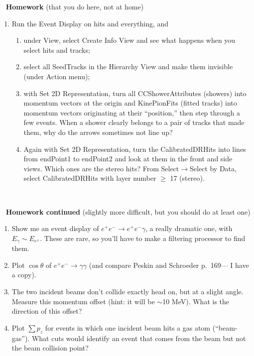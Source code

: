 \documentclass[landscape]{article}
\newenvironment{slide}{\mbox{ }\vfill}{\vfill \mbox{ } \pagebreak}
\begin{document}
\begin{slide}
{\bf Homework} (that you do here, not at home)

\begin{enumerate}\setlength{\itemsep}{1 cm}

  \item Run the Event Display on hits and everything, and
    \begin{enumerate}
      \item under View, select Create Info View and see what happens when you
	select hits and tracks;

      \item select all SeedTracks in the Hierarchy View and make them
	invisible (under Action menu);

      \item with Set 2D Representation, turn all CCShowerAttributes
	(showers) into momentum vectors at the origin and KinePionFits
	(fitted tracks) into momentum vectors originating at their
	``position,'' then step through a few events.  When a shower
	clearly belongs to a pair of tracks that made them, why do the
	arrows sometimes not line up?

      \item Again with Set 2D Representation, turn the
	CalibratedDRHits into lines from endPoint1 to endPoint2 and
	look at them in the front and side views.  Which ones are the
	stereo hits?  From Select$\to$Select by Data, select
	CalibratedDRHits with layer number $\ge$ 17 (stereo).
    \end{enumerate}
\end{enumerate}
\end{slide}

\begin{slide}
{\bf Homework continued} (slightly more difficult, but you should do
at least one)

\vfill
\begin{enumerate}\setlength{\itemsep}{1 cm}
  \addtocounter{enumi}{1}
  \item Show me an event display of $e^+e^- \to e^+e^-\gamma$, a
    really dramatic one, with $E_\gamma \sim E_{e^\pm}$.  These are
    rare, so you'll have to make a filtering processor to find them.

  \item Plot $\cos\theta$ of $e^+e^- \to \gamma\gamma$ (and compare
    Peskin and Schroeder p.\ 169--- I have a copy).

  \item The two incident beams don't collide exactly head on, but at a
    slight angle.  Measure this momentum offset (hint: it will be
    $\sim$10 MeV).  What is the direction of this offset?

  \item Plot $\displaystyle \sum p_z$ for events in which one incident
    beam hits a gas atom (``beam-gas'').  What cuts would identify an
    event that comes from the beam but not the beam collision point?

\end{enumerate}

\end{slide}
\end{document}
